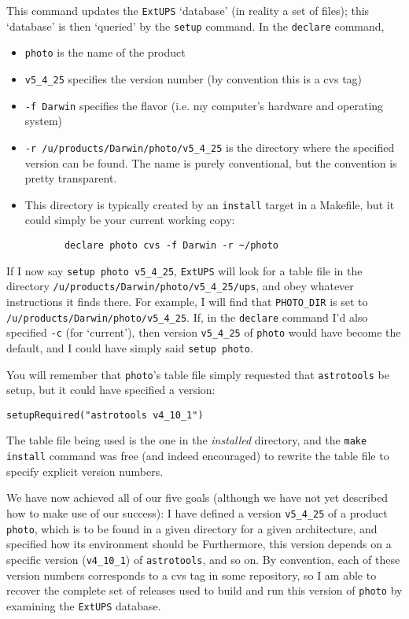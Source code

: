 \documentclass{article}
\newcommand{\code}[1]{\texttt{#1}}
\newcommand{\eups}{\code{ExtUPS}}
\begin{document}
This command updates the \eups{} `database' (in reality a set of files);
this `database' is then `queried' by the \code{setup} command. In
the \code{declare} command,
\begin{itemize}
  \item
    \code{photo} is the name of the product

  \item
    \code{v5\_4\_25} specifies the version number (by convention this
    is a cvs tag)

  \item
    \code{-f Darwin} specifies the flavor (i.e. my computer's hardware and
    operating system)

  \item
    \code{-r /u/products/Darwin/photo/v5\_4\_25} is the directory where
    the specified version can be found. The name is purely conventional,
    but the convention is pretty transparent.

  \item
    This directory is typically created by an \code{install} target
    in a Makefile, but it could simply be your current working
    copy:
\begin{verbatim}
       declare photo cvs -f Darwin -r ~/photo
\end{verbatim}
\end{itemize}

If I now say \code{setup photo v5\_4\_25}, \eups{} will look for
a table file in the directory \code{/u/products/Darwin/photo/v5\_4\_25/ups},
and obey whatever instructions it finds there.  For example,
I will find that
\code{PHOTO\_DIR} is set to \code{/u/products/Darwin/photo/v5\_4\_25}. If,
in the \code{declare} command I'd also specified \code{-c} (for
`current'), then version \code{v5\_4\_25} of \code{photo} would
have become the default, and I could have simply said \code{setup photo}.

You will remember that \code{photo}'s table file simply requested
that \code{astrotools} be setup, but it could have specified a version:
\begin{verbatim}
setupRequired("astrotools v4_10_1")
\end{verbatim}
The table file being used is the one in the \emph{installed} directory,
and the \code{make install} command was free (and indeed encouraged) to
rewrite the table file to specify explicit version numbers.

We have now achieved all of our five goals (although we have not
yet described how to make use of our success): I have defined
a version \code{v5\_4\_25} of a product \code{photo}, which is
to be found in a given directory for a given architecture,
and specified how its environment should be Furthermore,
this version depends on a specific version (\code{v4\_10\_1}) of
\code{astrotools}, and so on. By convention, each of these version
numbers corresponds to a cvs tag in some repository, so I am
able to recover the complete set of releases used to build and
run this version of \code{photo} by examining the \eups{} database.
\end{document}

